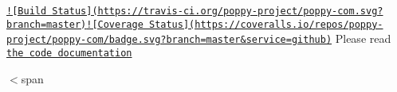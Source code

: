\href{https://travis-ci.org/poppy-project/poppy-com}{\tt !\mbox{[}Build Status\mbox{]}(https\-://travis-\/ci.\-org/poppy-\/project/poppy-\/com.\-svg?branch=master)}\href{https://coveralls.io/github/poppy-project/poppy-com?branch=master}{\tt !\mbox{[}Coverage Status\mbox{]}(https\-://coveralls.\-io/repos/poppy-\/project/poppy-\/com/badge.\-svg?branch=master\&service=github)} Please read \href{http://poppy-project.github.io/poppy-com/}{\tt the code documentation}

$<$span 